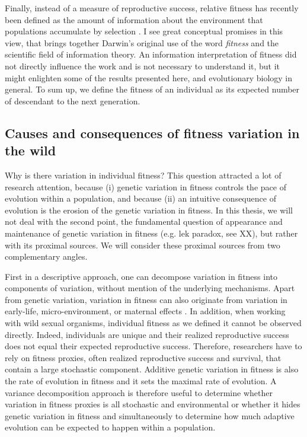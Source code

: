 Finally, instead of a measure of reproductive success, relative fitness has recently been defined as the amount of information about the environment that populations accumulate by selection \parencite{Frank2012V}. I see great conceptual promises in this view, that brings together Darwin's original use of the word \emph{fitness} and the scientific field of information theory. An information interpretation of fitness did not directly influence the work and is not necessary to understand it, but it might enlighten some of the results presented here, and evolutionary biology in general.
To sum up, we define the fitness of an individual as its expected number of descendant to the next generation.

\subsection{Causes and consequences of fitness variation in the wild}
Why is there variation in individual fitness? This question attracted a lot of research attention, because (i) genetic variation in fitness controls the pace of evolution within a population, and because (ii) an intuitive consequence of evolution is the erosion of the genetic variation in fitness. 
In this thesis, we will not deal with the second point, the fundamental question of appearance and maintenance of genetic variation in fitness (e.g. lek paradox, see XX), but rather with its proximal sources.
We will consider these proximal sources from two complementary angles. 

First in a descriptive approach, one can decompose variation in fitness into components of variation, without mention of the underlying mechanisms.
Apart from genetic variation, variation in fitness can also originate from variation in early-life, micro-environment, or maternal effects \parencite{Mcfarlane2015}. In addition, when working with wild sexual organisms, individual fitness as we defined it cannot be observed directly. Indeed, individuals are unique and their realized reproductive success does not equal their expected reproductive success. Therefore, researchers have to rely on fitness proxies, often realized reproductive success and survival, that contain a large stochastic component. Additive genetic variation in fitness is also the rate of evolution in fitness \parencite{Fisher1930} and it sets the maximal rate of evolution. A variance decomposition approach is therefore useful to determine whether variation in fitness proxies is all stochastic and environmental or whether it hides genetic variation in fitness and simultaneously to determine how much adaptive evolution can be expected to happen within a population.


